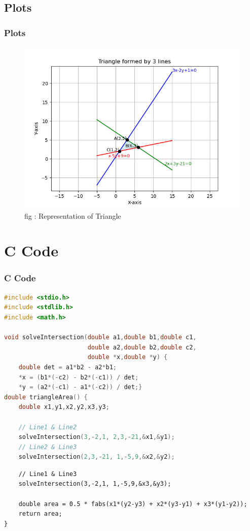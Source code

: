 \documentclass{beamer}
\theoremstyle{remark}
\numberwithin{equation}{section}
\begin{document}
\subsection{Plots}
\begin{frame}
\frametitle{Plots}
\begin{figure}
\centering
\includegraphics[width=0.9\columnwidth]{figs/fig8.png}
\caption{fig : Representation of Triangle}
\label{Fig8}
\end{figure}
\end{frame}
\section{C Code}
\begin{frame}[fragile]
\frametitle{C Code }
\begin{lstlisting}[language=C]  
#include <stdio.h>
#include <stdlib.h>
#include <math.h>

void solveIntersection(double a1,double b1,double c1,
                       double a2,double b2,double c2,
                       double *x,double *y) {
    double det = a1*b2 - a2*b1;
    *x = (b1*(-c2) - b2*(-c1)) / det;
    *y = (a2*(-c1) - a1*(-c2)) / det;}
double triangleArea() {
    double x1,y1,x2,y2,x3,y3;

    // Line1 & Line2
    solveIntersection(3,-2,1, 2,3,-21,&x1,&y1);
    // Line2 & Line3
    solveIntersection(2,3,-21, 1,-5,9,&x2,&y2);
\end{lstlisting}
\end{frame}
 \begin{frame}[fragile]
\begin{lstlisting}
    // Line1 & Line3
    solveIntersection(3,-2,1, 1,-5,9,&x3,&y3);

    double area = 0.5 * fabs(x1*(y2-y3) + x2*(y3-y1) + x3*(y1-y2));
    return area;
}

\end{lstlisting}
\end{frame}
\end{document}

